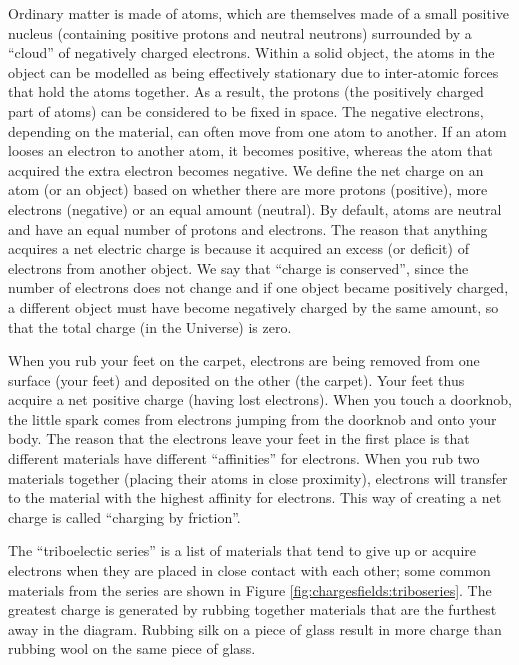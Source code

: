 Ordinary matter is made of atoms, which are themselves made of a small positive nucleus (containing positive protons and neutral neutrons) surrounded by a ``cloud'' of negatively charged electrons. Within a solid object, the atoms in the object can be modelled as being effectively stationary due to inter-atomic forces that hold the atoms together. As a result, the protons (the positively charged part of atoms) can be considered to be fixed in space. The negative electrons, depending on the material, can often move from one atom to another. If an atom looses an electron to another atom, it becomes positive, whereas the atom that acquired the extra electron becomes negative. We define the net charge on an atom (or an object) based on whether there are more protons (positive), more electrons (negative) or an equal amount (neutral). By default, atoms are neutral and have an equal number of protons and electrons. The reason that anything acquires a net electric charge is because it acquired an excess (or deficit) of electrons from another object. We say that ``charge is conserved'', since the number of electrons does not change and if one object became positively charged, a different object must have become negatively charged by the same amount, so that the total charge (in the Universe) is zero.

When you rub your feet on the carpet, electrons are being removed from one surface (your feet) and deposited on the other (the carpet). Your feet thus acquire a net positive charge (having lost electrons). When you touch a doorknob, the little spark comes from electrons jumping from the doorknob and onto your body. The reason that the electrons leave your feet in the first place is that different materials have different ``affinities'' for electrons. When you rub two materials together (placing their atoms in close proximity), electrons will transfer to the material with the highest affinity for electrons. This way of creating a net charge is called ``charging by friction''.

The ``triboelectic series'' is a list of materials that tend to give up or acquire electrons when they are placed in close contact with each other; some common materials from the series are shown in Figure \ref{fig:chargesfields:triboseries}.  The greatest charge is generated by rubbing together materials that are the furthest away in the diagram. Rubbing silk on a piece of glass result in more charge than rubbing wool on the same piece of glass.


